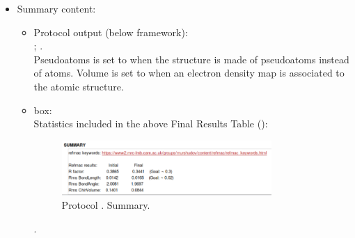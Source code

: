 \begin{itemize}
 \item Summary content:
  \begin{itemize}
     \item Protocol output (below \scipion framework):\\ ; .\\Pseudoatoms is set to  when the structure is made of pseudoatoms instead of atoms. Volume is set to  when an electron density map is associated to the atomic structure.
     \item {} box:\\Statistics included in the above Final Results Table ():
     \begin{figure}[H]
         \centering 
         \captionsetup{width=.7\linewidth} 
         \includegraphics[width=0.80\textwidth]{Images_appendix/Fig138.pdf}
         \caption{Protocol . Summary.}
         \label{fig:app_protocol_refmac_13}
        \end{figure}.\\
    \end{itemize}

  \end{itemize}

    
